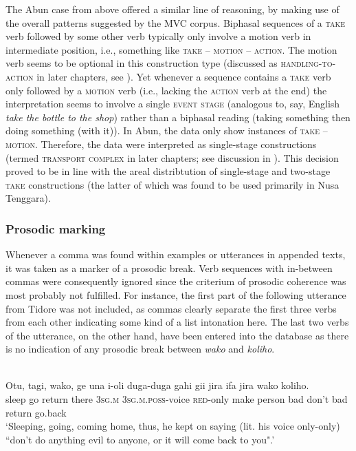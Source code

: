 The Abun case from above offered a similar line of reasoning, by making use of the overall patterns suggested by the MVC corpus. Biphasal sequences of a \textsc{take} verb followed by some other verb typically only involve a motion verb in intermediate position, i.e., something like \textsc{take} -- \textsc{motion} -- \textsc{action}. The motion verb seems to be optional in this construction type (discussed as \textsc{handling-to-action} in later chapters, see ). Yet whenever a sequence contains a \textsc{take} verb only followed by a \textsc{motion} verb (i.e., lacking the \textsc{action} verb at the end) the interpretation seems to involve a single \textsc{event stage} (analogous to, say, English \textit{take the bottle to the shop}) rather than a biphasal reading (taking something then doing something (with it)). In Abun, the data only show instances of \textsc{take} -- \textsc{motion}. Therefore, the data were interpreted as single-stage constructions (termed \textsc{transport complex} in later chapters; see discussion in ). This decision proved to be in line with the areal distribtution of single-stage and two-stage \textsc{take} constructions (the latter of which was found to be used primarily in Nusa Tenggara). 

\subsubsection{Prosodic marking}

Whenever a comma was found within examples or utterances in appended texts, it was taken as a marker of a prosodic break. Verb sequences with in-between commas were consequently ignored since the criterium of prosodic coherence was most probably not fulfilled. For instance, the first part of the following utterance from Tidore was not included, as commas clearly separate the first three verbs from each other indicating some kind of a list intonation here. The last two verbs of the utterance, on the other hand, have been entered into the database as there is no indication of any prosodic break between \textit{wako} and \textit{koliho}.

\ea 
{}\\
\gll Otu, tagi, wako, ge una i-oli duga-duga gahi gii jira ifa jira wako koliho. \\
sleep go return there 3\textsc{sg}.\textsc{m} 3\textsc{sg}.\textsc{m}.\textsc{poss}-voice \textsc{red}-only make person bad don't bad return go.back \\
\glft `Sleeping, going, coming home, thus, he kept on saying (lit. his voice only-only) ``don’t
do anything evil to anyone, or it will come back to you".’\\ 
\z

